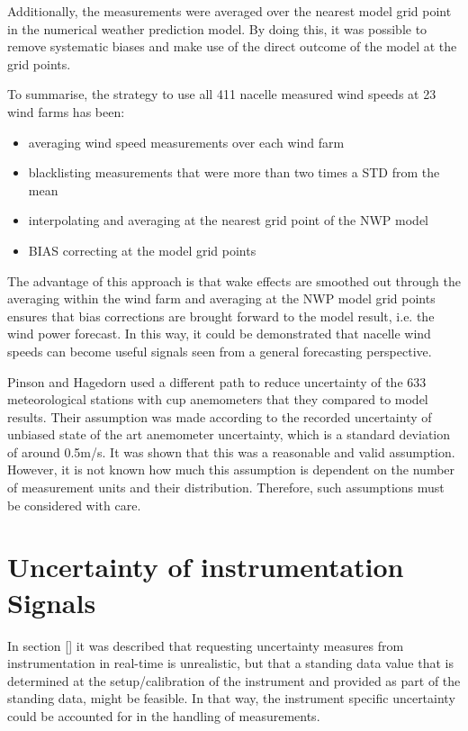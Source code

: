 Additionally, the measurements were averaged over the nearest model grid point in the numerical weather prediction model. By doing this, it was possible to remove systematic biases and make use of the direct outcome of the model at the grid points. 

To summarise, the strategy to use all 411 nacelle measured wind speeds at 23 wind farms has been: 

\begin{itemize}
    \item averaging wind speed measurements over each wind farm
    \item blacklisting measurements that were more than two times a STD from the mean
    \item interpolating and averaging at the nearest grid point of the NWP model
    \item BIAS correcting at the model grid points
\end{itemize}


The advantage of this approach is that wake effects are smoothed out through the averaging within the wind farm and averaging at the NWP model grid points ensures that bias corrections are brought forward to the model result, i.e. the wind power forecast. In this way, it could be demonstrated that nacelle wind speeds can become useful signals seen from a general forecasting perspective.  


Pinson and Hagedorn \cite{PinsonHagedorn2012} used a different path to reduce uncertainty of the 633 meteorological stations with cup anemometers that they compared to model results. Their assumption was made according to the recorded uncertainty of unbiased state of the art anemometer uncertainty, which is a standard deviation of around 0.5m/s. It was shown that this was a reasonable and valid assumption. However, it is not known how much this assumption is dependent on the number of measurement units and their distribution. Therefore, such assumptions must be considered with care. 



\section{Uncertainty of instrumentation Signals }\label{sec:instrumentuncertainty}

In section \ref{} it was described that requesting uncertainty measures from instrumentation in real-time is unrealistic, but that a standing data value that is determined at the setup/calibration of the instrument and provided as part of the standing data, might be feasible.
{\color{blue}{comment SW 210715: This first sentence should be changed! I believe we must provide some uncertainty even with the live data. I think real time data is provided with uncertainty in many cases, It is difficult but can be done. }}
In that way, the instrument specific uncertainty could be accounted for in the handling of measurements. 

